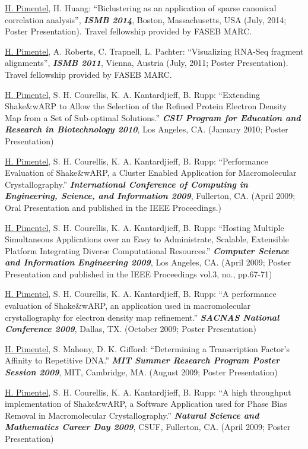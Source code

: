 \documentclass[overlapped]{res}
\begin{document}
\begin{resume}
\underline{H. Pimentel}, H. Huang: ``Biclustering as an application of sparse
canonical correlation analysis'', {\bf \emph{ISMB 2014}}, Boston, Massachusetts,
USA (July, 2014; Poster Presentation). Travel fellowship provided by FASEB
MARC.

\underline{H. Pimentel}, A. Roberts, C. Trapnell, L. Pachter: ``Visualizing
RNA-Seq fragment alignments'', {\bf \emph{ISMB 2011}}, Vienna, Austria (July,
2011; Poster Presentation). Travel fellowship provided by FASEB MARC.

\underline{H. Pimentel}, S. H. Courellis, K. A. Kantardjieff, B. Rupp:
``Extending Shake\&wARP to Allow the Selection of the Refined Protein Electron
Density Map from a Set of Sub-optimal Solutions.'' {\bf \emph{CSU Program for
    Education and Research in Biotechnology 2010}}, Los Angeles, CA. (January
2010; Poster Presentation)

\underline{H. Pimentel}, S. H. Courellis, K. A. Kantardjieff, B. Rupp:
``Performance Evaluation of Shake\&wARP, a Cluster Enabled Application for
Macromolecular Crystallography.'' {\bf \emph{International Conference of
    Computing in Engineering, Science, and Information
    2009}}, Fullerton, CA. (April 2009; Oral Presentation and published in the
         IEEE Proceedings.)

\underline{H. Pimentel}, S. H. Courellis, K. A. Kantardjieff, B. Rupp:
``Hosting Multiple Simultaneous Applications over an Easy to
Administrate, Scalable, Extensible Platform Integrating Diverse
Computational Resources.'' {\bf \emph{Computer Science and Information
    Engineering 2009}}, Los Angeles,
CA. (April 2009; Poster Presentation and published in the
IEEE Proceedings vol.3, no., pp.67-71)

\underline{H. Pimentel}, S. H. Courellis, K. A. Kantardjieff, B. Rupp: ``A
performance evaluation of Shake\&wARP, an application used in macromolecular
crystallography for electron density map refinement.''  {\bf \emph{SACNAS
    National Conference 2009}}, Dallas, TX. (October 2009; Poster Presentation)

\underline{H. Pimentel}, S. Mahony, D. K. Gifford: ``Determining a
Transcription Factor's Affinity to Repetitive DNA.'' {\bf \emph{MIT
    Summer Research Program Poster Session 2009}}, MIT, Cambridge,
MA. (August 2009; Poster Presentation)

\underline{H. Pimentel}, S. H. Courellis, K. A. Kantardjieff, B. Rupp: ``A high
throughput implementation of Shake\&wARP, a Software Application used for Phase
Bias Removal in Macromolecular Crystallography.'' {\bf \emph{Natural Science and
    Mathematics Career Day 2009}}, CSUF, Fullerton, CA. (April 2009; Poster
Presentation)


\end{resume}
\end{document}
